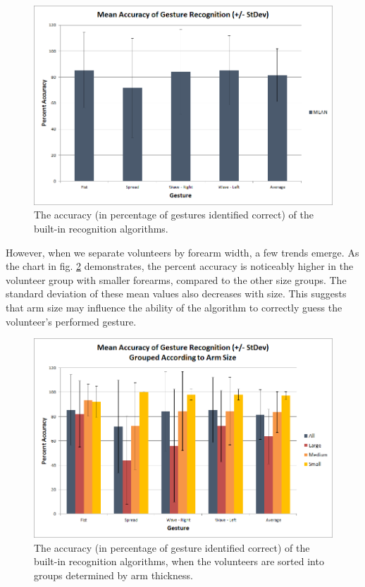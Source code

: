 \documentclass[journal]{IEEEtran}
\begin{document}
    \begin{figure}[H]
    \begin{centering}
    \includegraphics[width=.8\columnwidth]{EMG/Accuracy_Ungrouped}
    \caption{The accuracy (in percentage of gestures identified correct) of the built-in recognition algorithms.}
    \label{accungroup}
    \end{centering}
    \end{figure}
    
However, when we separate volunteers by forearm width, a few trends emerge. As the chart in fig. \ref{accgroup} demonstrates, the percent accuracy is noticeably higher in the volunteer group with smaller forearms, compared to the other size groups. The standard deviation of these mean values also decreases with size. This suggests that arm size may influence the ability of the algorithm to correctly guess the volunteer's performed gesture.

    \begin{figure}[H]
    \begin{centering}
    \includegraphics[width=.8\columnwidth]{EMG/Accuracy_Grouped}
    \caption{The accuracy (in percentage of gesture identified correct) of the built-in recognition algorithms, when the volunteers are sorted into groups determined by arm thickness.}
    \label{accgroup}
    \end{centering}
    \end{figure}
    
\end{document}
